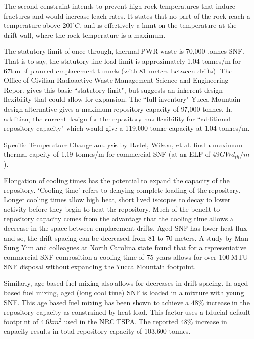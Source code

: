 The second constraint intends to prevent high rock temperatures that induce
fractures and would increase leach rates. It states that no part of the rock
reach a temperature above $200^{\circ}C$, and is effectively a limit on the
temperature at the drift wall, where the rock temperature is a maximum.  

The statutory limit of once-through, thermal PWR waste is 70,000 tonnes SNF.
That is to say, the statutory line load limit is approximately 1.04 tonnes/m
for 67km of planned emplacement tunnels (with 81 meters between drifts). The
Office of Civilian Radioactive Waste Management Science and Engineering Report
gives this basic ``statutory limit", but suggests an inherent design
flexibility that could allow for expansion. The ``full inventory" Yucca
Mountain design alternative gives a maximum repository capacity of 97,000
tonnes. In addition, the current design for the repository has flexibility for
``additional repository capacity" which would give a 119,000 tonne capacity at
1.04 tonnes/m.\cite{ doe_yucca_2002}

Specific Temperature Change analysis by Radel, Wilson, et al. find a maximum
thermal capcity of 1.09 tonnes/m for commercial SNF (at an ELF of $49
GWd_{th}/m$).\cite{radel_effect_2007} 

Elongation of cooling times has the potential to expand the capacity of the
repository. `Cooling time' refers to delaying complete loading of the
repository. Longer cooling times allow high heat, short lived isotopes to decay
to lower activity before they begin to heat the repository. Much of the benefit
to repository capacity comes from the advantage that the cooling time allows a
decrease in the space between emplacement drifts. Aged SNF has lower heat flux
and so, the drift spacing can be decreased from 81 to 70 meters. A study by
Man-Sung Yim and colleagues at North Carolina state found that for a
representative commercial SNF composition a cooling time of 75 years allows for
over 100 MTU SNF disposal without expanding the Yucca Mountain
footprint.\cite{li_examining_2007}

Similarly, age based fuel mixing also allows for decreases in drift spacing. In
aged based fuel mixing, aged (long cool time) SNF is loaded in a mixture with
young SNF. This age based fuel mixing has been shown to achieve a $48\%$
increase in the repository capacity as constrained by heat
load.\cite{nicholson_thermal_2007} This factor uses a fiducial default
footprint of $4.6 km^2$ used in the NRC TSPA.  The reported $48\%$ increase in
capacity results in total repository capacity of 103,600
tonnes.\cite{williams_contract_2001}

